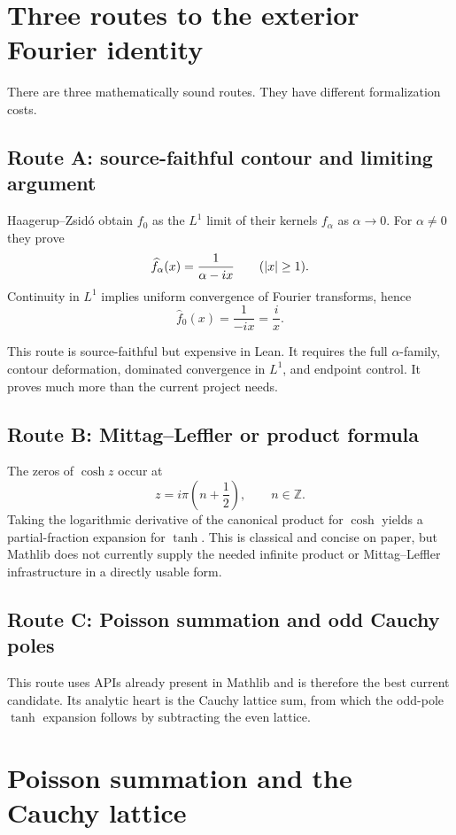 \section{Three routes to the exterior Fourier identity}

There are three mathematically sound routes. They have different formalization costs.

\subsection{Route A: source-faithful contour and limiting argument}

Haagerup--Zsid\'o obtain $f_0$ as the $L^1$ limit of their kernels $f_\alpha$ as $\alpha\to0$. For $\alpha\ne0$ they prove
\[
  \widehat f_\alpha(x)=\frac1{\alpha-ix}
  \qquad(\left\lvert x\right\rvert\ge1).
\]
Continuity in $L^1$ implies uniform convergence of Fourier transforms, hence
\[
  \widehat f_0(x)=\frac1{-ix}=\frac{i}{x}.
\]

This route is source-faithful but expensive in Lean. It requires the full $\alpha$-family, contour deformation, dominated convergence in $L^1$, and endpoint control. It proves much more than the current project needs.

\subsection{Route B: Mittag--Leffler or product formula}

The zeros of $\cosh z$ occur at
\[
  z=i\pi\left(n+\frac12\right),\qquad n\in\mathbb Z.
\]
Taking the logarithmic derivative of the canonical product for $\cosh$ yields a partial-fraction expansion for $\tanh$. This is classical and concise on paper, but Mathlib does not currently supply the needed infinite product or Mittag--Leffler infrastructure in a directly usable form.

\subsection{Route C: Poisson summation and odd Cauchy poles}

This route uses APIs already present in Mathlib and is therefore the best current candidate. Its analytic heart is the Cauchy lattice sum, from which the odd-pole $\tanh$ expansion follows by subtracting the even lattice.

\section{Poisson summation and the Cauchy lattice}

